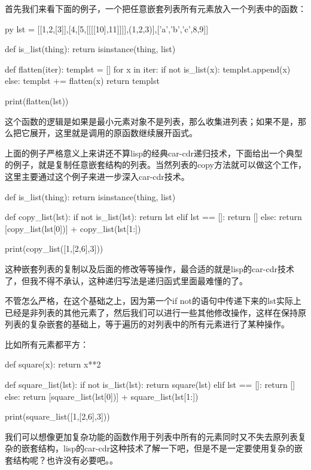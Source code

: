 \documentclass[12pt,oneside]{book}
\begin{document}
\begin{common-format}
首先我们来看下面的例子，一个把任意嵌套列表所有元素放入一个列表中的函数：
\begin{xverbatim}[129]{py}
lst = [[1,2,[3]],[4,[5,[[[[10],11]]]],(1,2,3)],[{'a','b','c'},8,9]]

def is_list(thing):
    return isinstance(thing, list)

def flatten(iter):
    templst = []
    for x in iter:
        if not is_list(x):
            templst.append(x)
        else:
            templst += flatten(x)
    return templst

print(flatten(lst))
\end{xverbatim}

这个函数的逻辑是如果是最小元素对象不是列表，那么收集进列表；如果不是，那么把它展开，这里就是调用的原函数继续展开函式。

上面的例子严格意义上来讲还不算lisp的经典car-cdr递归技术，下面给出一个典型的例子，就是复制任意嵌套结构的列表。当然列表的copy方法就可以做这个工作，这里主要通过这个例子来进一步深入car-cdr技术。

\begin{tcbpython}[]
def is_list(thing):
    return isinstance(thing, list)

def copy_list(lst):
    if  not  is_list(lst):
        return lst
    elif lst == []:
        return []
    else:
        return [copy_list(lst[0])] + copy_list(lst[1:])

print(copy_list([1,[2,6],3]))
\end{tcbpython}


这种嵌套列表的复制以及后面的修改等等操作，最合适的就是lisp的car-cdr技术了，但我不得不承认，这种递归写法是递归函式里面最难懂的了。

不管怎么严格，在这个基础之上，因为第一个if not的语句中传递下来的lst实际上已经是非列表的其他元素了，然后我们可以进行一些其他修改操作，这样在保持原列表的复杂嵌套的基础上，等于遍历的对列表中的所有元素进行了某种操作。

比如所有元素都平方：
\begin{tcbpython}[]
def square(x):
    return x**2

def square_list(lst):
    if  not  is_list(lst):
        return square(lst)
    elif lst == []:
        return []
    else:
        return [square_list(lst[0])] + square_list(lst[1:])

print(square_list([1,[2,6],3]))
\end{tcbpython}

我们可以想像更加复杂功能的函数作用于列表中所有的元素同时又不失去原列表复杂的嵌套结构，lisp的car-cdr这种技术了解一下吧，但是不是一定要使用复杂的嵌套结构呢？也许没有必要吧。。



\end{common-format}
\end{document}
